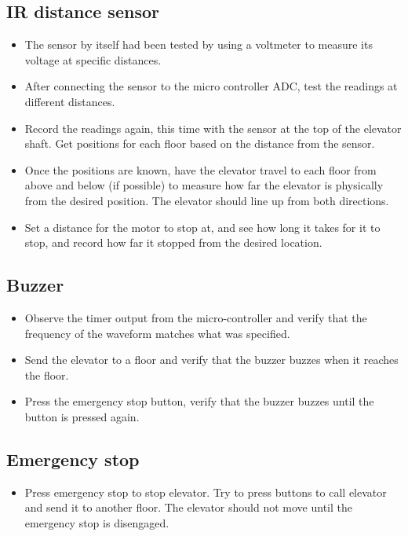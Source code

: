 \documentclass{article}
\begin{document}
	    \subsection{IR distance sensor}
	    \begin{itemize}
	        \item The sensor by itself had been tested by using a voltmeter to measure its voltage at specific distances.
	        \item After connecting the sensor to the micro controller ADC, test the readings at different distances.
	        \item Record the readings again, this time with the sensor at the top of the elevator shaft. Get positions for each floor based on the distance from the sensor.
	        \item Once the positions are known, have the elevator travel to each floor from above and below (if possible) to measure how far the elevator is physically from the desired position. The elevator should line up from both directions.
	        \item Set a distance for the motor to stop at, and see how long it takes for it to stop, and record how far it stopped from the desired location.
	    \end{itemize}
	    
	    \subsection{Buzzer}
	    \begin{itemize}
	        \item Observe the timer output from the micro-controller and verify that the frequency of the waveform matches what was specified.
	        \item Send the elevator to a floor and verify that the buzzer buzzes when it reaches the floor.
	        \item Press the emergency stop button, verify that the buzzer buzzes until the button is pressed again.
	    \end{itemize}
	    
	    \subsection{Emergency stop}
	    \begin{itemize}
	        \item Press emergency stop to stop elevator. Try to press buttons to call elevator and send it to another floor. The elevator should not move until the emergency stop is disengaged.
	    \end{itemize}
	    
\end{document}
